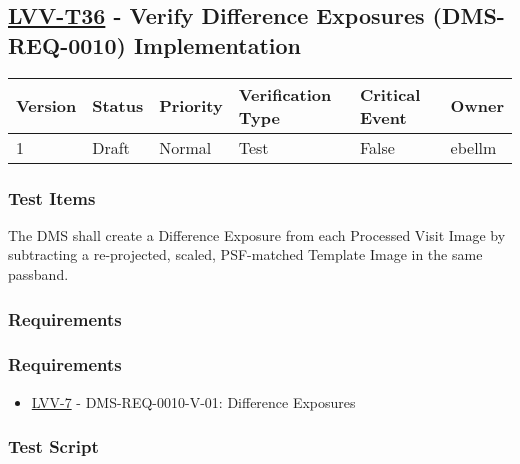 \hypertarget{lvv-t36---verify-difference-exposures-dms-req-0010-implementation}{%
\subsection{\texorpdfstring{\href{https://jira.lsstcorp.org/secure/Tests.jspa\#/testCase/LVV-T36}{LVV-T36}
- Verify Difference Exposures (DMS-REQ-0010)
Implementation}{LVV-T36 - Verify Difference Exposures (DMS-REQ-0010) Implementation}}\label{lvv-t36---verify-difference-exposures-dms-req-0010-implementation}}

\begin{longtable}[]{@{}llllll@{}}
\toprule
Version & Status & Priority & Verification Type & Critical Event &
Owner\tabularnewline
\midrule
\endhead
1 & Draft & Normal & Test & False & ebellm\tabularnewline
\bottomrule
\end{longtable}

\hypertarget{test-items-17}{%
\subsubsection{Test Items}\label{test-items-17}}

The DMS shall create a Difference Exposure from each Processed Visit
Image by subtracting a re-projected, scaled, PSF-matched Template Image
in the same passband.

\hypertarget{requirements-34}{%
\subsubsection{Requirements}\label{requirements-34}}

\hypertarget{requirements-35}{%
\subsubsection{Requirements}\label{requirements-35}}

\begin{itemize}
\tightlist
\item
  \href{https://jira.lsstcorp.org/browse/LVV-7}{LVV-7} -
  DMS-REQ-0010-V-01: Difference Exposures
\end{itemize}

\hypertarget{test-script-17}{%
\subsubsection{Test Script}\label{test-script-17}}

